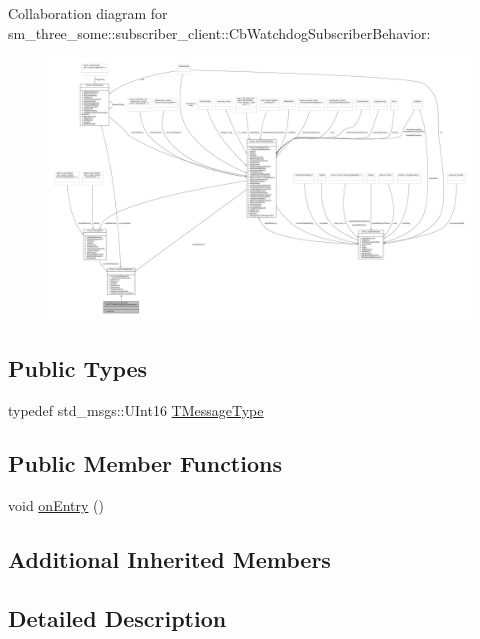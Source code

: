 Collaboration diagram for sm\+\_\+three\+\_\+some\+:\+:subscriber\+\_\+client\+:\+:Cb\+Watchdog\+Subscriber\+Behavior\+:
\nopagebreak
\begin{figure}[H]
\begin{center}
\leavevmode
\includegraphics[width=350pt]{classsm__three__some_1_1subscriber__client_1_1CbWatchdogSubscriberBehavior__coll__graph}
\end{center}
\end{figure}
\subsection*{Public Types}
\begin{DoxyCompactItemize}
\item 
typedef std\+\_\+msgs\+::\+U\+Int16 \hyperlink{classsm__three__some_1_1subscriber__client_1_1CbWatchdogSubscriberBehavior_abc4b01bc969785663bcf3874978f54ea}{T\+Message\+Type}
\end{DoxyCompactItemize}
\subsection*{Public Member Functions}
\begin{DoxyCompactItemize}
\item 
void \hyperlink{classsm__three__some_1_1subscriber__client_1_1CbWatchdogSubscriberBehavior_ae3ddc759022689dfa5117e7cff8bd2ef}{on\+Entry} ()
\end{DoxyCompactItemize}
\subsection*{Additional Inherited Members}


\subsection{Detailed Description}


